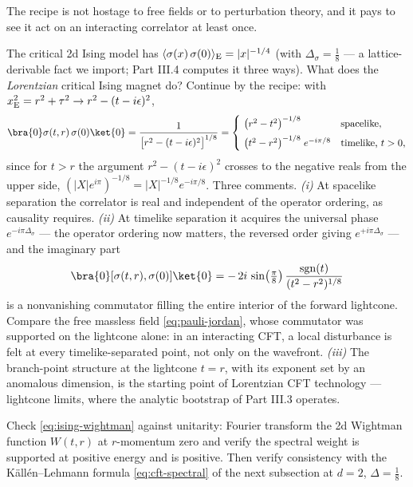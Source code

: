 The recipe is not hostage to free fields or to perturbation theory, and it
pays to see it act on an interacting correlator at least once.

\begin{eexample}
\label{ex:ising-lorentzian}
The critical 2d Ising model has $\langle\sigma(x)\,\sigma(0)\rangle_{\rm E} =
|x|^{-1/4}$ (with $\Delta_\sigma = \tfrac18$ --- a lattice-derivable fact we
import; Part III.4 computes it three ways). What does the \emph{Lorentzian}
critical Ising magnet do? Continue by the recipe: with $x^2_{\rm E} = r^2 +
\tau^2 \to r^2 - (t - i\epsilon)^2$,
\begin{equation}
\bra{0}\sigma(t, r)\,\sigma(0)\ket{0}
= \frac{1}{\big[r^2 - (t - i\epsilon)^2\big]^{1/8}}
= \begin{cases}
\ \big(r^2 - t^2\big)^{-1/8} & \text{spacelike}, \\[4pt]
\ \big(t^2 - r^2\big)^{-1/8}\; e^{-i\pi/8} & \text{timelike, } t > 0,
\end{cases}
\label{eq:ising-wightman}
\end{equation}
since for $t > r$ the argument $r^2 - (t-i\epsilon)^2$ crosses to the
negative reals from the upper side, $(|X| e^{i\pi})^{-1/8} = |X|^{-1/8}
e^{-i\pi/8}$. Three comments. \emph{(i)} At spacelike separation the
correlator is real and independent of the operator ordering, as causality
requires. \emph{(ii)} At
timelike separation it acquires the universal phase $e^{-i\pi \Delta_\sigma}$
--- the operator ordering now matters, the reversed order giving
$e^{+i\pi\Delta_\sigma}$ --- and the imaginary part
\begin{equation}
\bra{0}[\sigma(t,r), \sigma(0)]\ket{0}
= -\,2i\,\sin\!\big(\tfrac{\pi}{8}\big)\,
\frac{\mathrm{sgn}(t)}{(t^2 - r^2)^{1/8}}
\end{equation}
is a nonvanishing commutator filling the entire interior of the forward
lightcone. Compare the free massless field \eqref{eq:pauli-jordan}, whose
commutator was supported on the lightcone alone: in an interacting CFT, a
local disturbance is felt at every timelike-separated point, not only on the
wavefront. \emph{(iii)} The branch-point structure at the lightcone $t = r$,
with its exponent set by an anomalous dimension, is the starting point of
Lorentzian CFT technology --- lightcone limits, where the analytic bootstrap
of Part III.3 operates.
\end{eexample}

\begin{exercise}[medium]
\label{exr:ising-spectral}
Check \eqref{eq:ising-wightman} against unitarity: Fourier transform the 2d
Wightman function $W(t, r)$ at $r$-momentum zero and verify the spectral
weight is supported at positive energy and is positive. Then verify
consistency with the K\"all\'en--Lehmann formula \eqref{eq:cft-spectral} of
the next subsection at $d = 2$, $\Delta = \frac18$.
\end{exercise}

